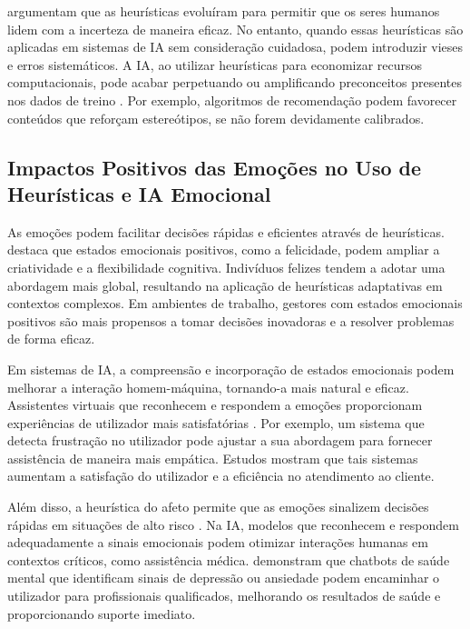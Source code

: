 \documentclass[a4paper,12pt]{report}
\begin{document}
	\textcite{gigerenzer2009} argumentam que as heurísticas evoluíram para permitir que os seres humanos lidem com a incerteza de maneira eficaz. No entanto, quando essas heurísticas são aplicadas em sistemas de IA sem consideração cuidadosa, podem introduzir vieses e erros sistemáticos. A IA, ao utilizar heurísticas para economizar recursos computacionais, pode acabar perpetuando ou amplificando preconceitos presentes nos dados de treino \parencite{bechara2000}. Por exemplo, algoritmos de recomendação podem favorecer conteúdos que reforçam estereótipos, se não forem devidamente calibrados.
	
	\subsection{Impactos Positivos das Emoções no Uso de Heurísticas e IA Emocional}
	
	As emoções podem facilitar decisões rápidas e eficientes através de heurísticas. \textcite{isen2001} destaca que estados emocionais positivos, como a felicidade, podem ampliar a criatividade e a flexibilidade cognitiva. Indivíduos felizes tendem a adotar uma abordagem mais global, resultando na aplicação de heurísticas adaptativas em contextos complexos. Em ambientes de trabalho, gestores com estados emocionais positivos são mais propensos a tomar decisões inovadoras e a resolver problemas de forma eficaz.
	
	Em sistemas de IA, a compreensão e incorporação de estados emocionais podem melhorar a interação homem-máquina, tornando-a mais natural e eficaz. Assistentes virtuais que reconhecem e respondem a emoções proporcionam experiências de utilizador mais satisfatórias \parencite{picard1997}. Por exemplo, um sistema que detecta frustração no utilizador pode ajustar a sua abordagem para fornecer assistência de maneira mais empática. Estudos mostram que tais sistemas aumentam a satisfação do utilizador e a eficiência no atendimento ao cliente.
	
	Além disso, a heurística do afeto permite que as emoções sinalizem decisões rápidas em situações de alto risco \parencite{slovic2007}. Na IA, modelos que reconhecem e respondem adequadamente a sinais emocionais podem otimizar interações humanas em contextos críticos, como assistência médica. \textcite{miner2016} demonstram que chatbots de saúde mental que identificam sinais de depressão ou ansiedade podem encaminhar o utilizador para profissionais qualificados, melhorando os resultados de saúde e proporcionando suporte imediato.
	
\end{document}
